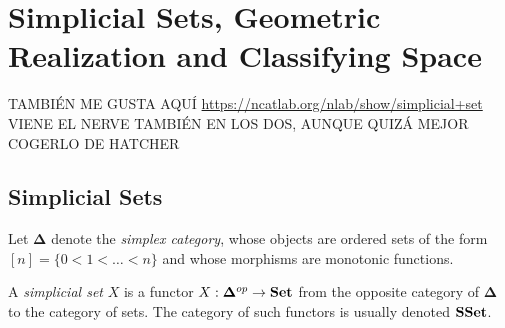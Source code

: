 \documentclass[TFM.tex]{subfiles}
\begin{document}
\chapter{Simplicial Sets, Geometric Realization and Classifying Space}






TAMBIÉN ME GUSTA AQUÍ \url{https://ncatlab.org/nlab/show/simplicial+set} VIENE EL NERVE TAMBIÉN EN LOS DOS, AUNQUE QUIZÁ MEJOR COGERLO DE HATCHER







\section{Simplicial Sets}

Let $\mathbf{\Delta}$ denote the \emph{simplex category}, whose objects are ordered sets of the form $[n]=\{0<1<\dots< n\}$ and whose morphisms are monotonic functions. 

\begin{defi}
A \emph{simplicial set} $X$ is a functor $X:\mathbf{\Delta}^{op}\to\mathrm{\mathbf{Set}}$ from the opposite category of $\mathbf{\Delta}$ to the category of sets. The category of such functors is usually denoted $\mathrm{\mathbf{SSet}}$. 
\end{defi}
\end{document}
